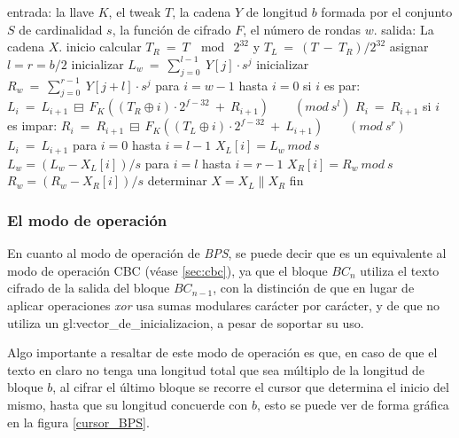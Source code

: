 \begin{pseudocodigo}[caption={Proceso de descifrado $BC^{-1}$.},
label={descifrado_BC}]
    entrada:    la llave $K$,
                el tweak $T$,
                la cadena $Y$ de longitud $b$ formada por el conjunto $S$
                  de cardinalidad $s$,
                la función de cifrado $F$,
                el número de rondas $w$.
    salida:     La cadena $X$.
    inicio
      calcular $T_R\: =\: T\: \mod\: 2^{32}$ y $T_L\: =\: (T\: -\: T_R) / 2^{32}$
      asignar $l = r = b/2$
      inicializar $L_w\: =\: \sum_{j=0}^{l-1}\: Y[j] \cdot s^j$
      inicializar $R_w\: =\: \sum_{j=0}^{r-1}\: Y[j+l] \cdot s^j$
      para $i=w-1$ hasta $i=0$
      si $i$ es par:
        $L_i\: =\: L_{i+1}\: \boxminus\: F_K((T_R \oplus i) \cdot 2^{f-32}\: +\: R_{i+1})\qquad (mod\ s^l)$
        $R_i\: =\: R_{i+1}$
      si $i$ es impar:
        $R_i\: =\: R_{i+1}\: \boxminus\: F_K((T_L \oplus i) \cdot 2^{f-32}\: +\: L_{i+1})\qquad (mod\ s^r)$
        $L_i\: =\: L_{i+1}$
      para $i=0$ hasta $i=l-1$
        $X_L[i] = L_w\ mod\ s$
        $L_w = (L_w - X_L[i])/s$
      para $i=l$ hasta $i=r-1$
        $X_R[i] = R_w\ mod\ s$
        $R_w = (R_w - X_R[i])/s$
      determinar $X = X_L \parallel X_R$
    fin
\end{pseudocodigo}


\subsubsection{El modo de operación}

En cuanto al modo de operación de \textit{BPS}, se puede decir que es un
equivalente al modo de operación CBC (véase \ref{sec:cbc}), ya que el bloque
$BC_n$ utiliza el texto cifrado de la salida del bloque $BC_{n-1}$, con la
distinción de que en lugar de aplicar operaciones \textit{xor} usa sumas
modulares carácter por carácter, y de que no utiliza un
\gls{gl:vector_de_inicializacion}, a pesar de soportar su uso.

Algo importante a resaltar de este modo de operación es que, en caso de que el
texto en claro no tenga una longitud total que sea múltiplo de la longitud de
bloque $b$, al cifrar el último bloque se recorre el cursor que determina
el inicio del mismo, hasta que su longitud concuerde con $b$, esto se puede
ver de forma gráfica en la figura \ref{cursor_BPS}.

